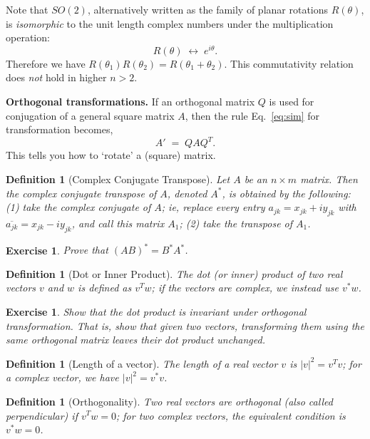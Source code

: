 \documentclass[12pt,letterpaper]{report}
\newcommand\be{\begin{equation}}
\newcommand\ee{\end{equation}}
\newtheorem{defi}[thm]{Definition}
\newtheorem{exe}[thm]{Exercise}
\begin{document}
Note that $SO(2)$, alternatively written as the family of planar
rotations $R(\theta)$, is {\em isomorphic} to the unit length
complex numbers under the multiplication operation: \be R(\theta)
\; \longleftrightarrow \; e^{i\theta} . \ee Therefore we have
$R(\theta_1)R(\theta_2) = R(\theta_1 + \theta_2)$. This
commutativity relation does {\em not} hold in higher $n > 2$.


{\bf Orthogonal transformations.} If an orthogonal matrix $Q$ is
used for conjugation of a general square matrix $A$, then the rule
Eq.~\ref{eq:sim} for transformation becomes, \be
    A' \; = \; Q A Q^T.
\ee This tells you how to `rotate' a (square) matrix.


\begin{defi}[Complex Conjugate Transpose] Let $A$ be an $n \times m$
matrix. Then the complex conjugate transpose of $A$, denoted
$A^{*}$, is obtained by the following: (1) take the complex
conjugate of $A$; ie, replace every entry $a_{jk} = x_{jk} + i
y_{jk}$ with $\overline{a_{jk}} = x_{jk} - i y_{jk}$, and call
this matrix $A_1$; (2) take the transpose of $A_1$. \end{defi}

\begin{exe} Prove that $(AB)^{*} = B^{*}A^{*}$. \end{exe}

\begin{defi}[Dot or Inner Product] The dot (or inner) product of
two real vectors $v$ and $w$ is defined as $v^T w$; if the vectors
are complex, we instead use $v^{*} w$. \end{defi}

\begin{exe}
Show that the dot product is invariant under orthogonal
transformation. That is, show that given two vectors, transforming
them using the same orthogonal matrix leaves their dot product
unchanged.
\end{exe}

\begin{defi}[Length of a vector] The length of a real vector $v$
is $|v|^2 = v^T v$; for a complex vector, we have $|v|^2 = v^{*}
v$. \end{defi}

\begin{defi}[Orthogonality] Two real vectors are orthogonal (also
called perpendicular) if $v^T w = 0$; for two complex vectors, the
equivalent condition is $v^{*} w = 0$. \end{defi}
\end{document}

